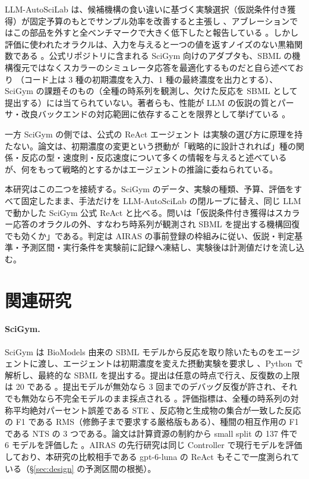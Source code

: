 \documentclass{article}
\begin{document}
LLM-AutoSciLab は、候補機構の食い違いに基づく実験選択（仮説条件付き獲得）が固定予算のもとでサンプル効率を改善すると主張し \cite[s2.p2]{kabra-2026-llm}、アブレーションではこの部品を外すと全ベンチマークで大きく低下したと報告している \cite[s2.p7]{kabra-2026-llm}。しかし評価に使われたオラクルは、入力を与えると一つの値を返すノイズのない黒箱関数である \cite[s2.p5]{kabra-2026-llm}。公式リポジトリに含まれる SciGym 向けのアダプタも、SBML の機構復元ではなくスカラーのシミュレータ応答を最適化するものだと自ら述べており \cite[s2.p14]{kabra-2026-llm}（コード上は 3 種の初期濃度を入力、1 種の最終濃度を出力とする）、SciGym の課題そのもの（全種の時系列を観測し、欠けた反応を SBML として提出する）には当てられていない。著者らも、性能が LLM の仮説の質とパーサ・改良バックエンドの対応範囲に依存することを限界として挙げている \cite[s2.p8]{kabra-2026-llm}。

一方 SciGym の側では、公式の ReAct エージェント \cite[s1.p3]{duan-2025-measuring} は実験の選び方に原理を持たない。論文は、初期濃度の変更という摂動が「戦略的に設計されれば」種の関係・反応の型・速度則・反応速度について多くの情報を与えると述べている \cite[s1.p8]{duan-2025-measuring} が、何をもって戦略的とするかはエージェントの推論に委ねられている。

本研究はこの二つを接続する。SciGym のデータ、実験の種類、予算、評価をすべて固定したまま、手法だけを LLM-AutoSciLab の閉ループに替え、同じ LLM で動かした SciGym 公式 ReAct と比べる。問いは「仮説条件付き獲得はスカラー応答のオラクルの外、すなわち時系列が観測され SBML を提出する機構回復でも効くか」である。判定は AIRAS の事前登録の枠組みに従い、仮説・判定基準・予測区間・実行条件を実験前に記録へ凍結し、実験後は計測値だけを流し込む。

\section{関連研究}
\label{sec:related}
\paragraph{SciGym.}
SciGym \citep{duan-2025-measuring} は BioModels 由来の SBML モデルから反応を取り除いたものをエージェントに渡し、エージェントは初期濃度を変えた摂動実験を要求し \cite[s1.p4]{duan-2025-measuring}、Python で解析し、最終的な SBML を提出する。提出は任意の時点で行え、反復数の上限は 20 である \cite[s1.p1]{duan-2025-measuring}。提出モデルが無効なら 3 回までのデバッグ反復が許され、それでも無効なら不完全モデルのまま採点される \cite[s1.p2]{duan-2025-measuring}。評価指標は、全種の時系列の対称平均絶対パーセント誤差である STE \cite[s1.p5]{duan-2025-measuring}、反応物と生成物の集合が一致した反応の F1 である RMS（修飾子まで要求する厳格版もある）\cite[s1.p6]{duan-2025-measuring}、種間の相互作用の F1 である NTS \cite[s1.p7]{duan-2025-measuring} の 3 つである。論文は計算資源の制約から small split の 137 件で 6 モデルを評価した \cite[s1.p9]{duan-2025-measuring}。AIRAS の先行研究は同じ Controller で現行モデルを評価しており、本研究の比較相手である gpt-6-luna の ReAct もそこで一度測られている（§\ref{sec:design} の予測区間の根拠）。
\end{document}

